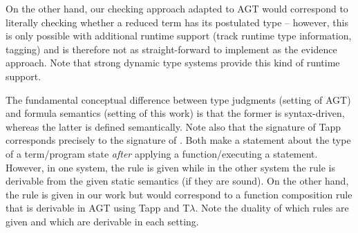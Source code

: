 On the other hand, our checking approach adapted to AGT would correspond to literally checking whether a reduced term has its postulated type -- however, this is only possible with additional runtime support (track runtime type information, tagging) and is therefore not as straight-forward to implement as the evidence approach.
Note that strong dynamic type systems provide this kind of runtime support.

The fundamental conceptual difference between type judgments (setting of AGT) and formula semantics (setting of this work) is that the former is syntax-driven, whereas the latter is defined semantically.
Note also that the signature of Tapp corresponds precisely to the signature of .
Both make a statement about the type of a term/program state \emph{after} applying a function/executing a statement.
However, in one system, the rule is given while in the other system the rule is derivable from the given static semantics (if they are sound).
On the other hand, the rule  is given in our work but would correspond to a function composition rule that is derivable in AGT using Tapp and T$\lambda$.
Note the duality of which rules are given and which are derivable in each setting.




